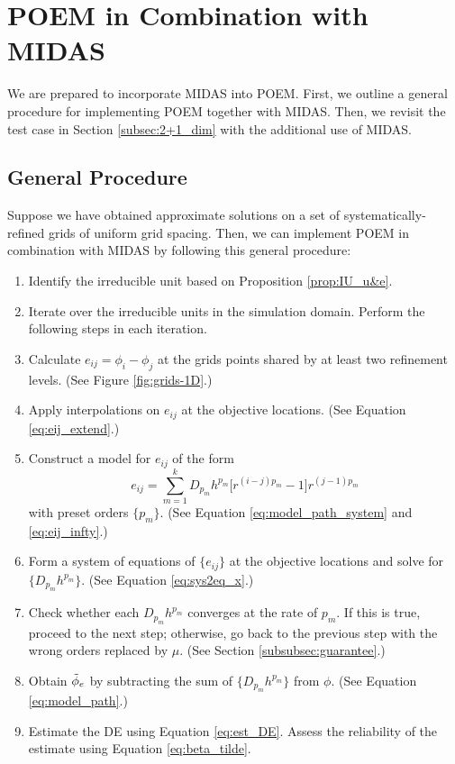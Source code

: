 \section{POEM in Combination with MIDAS} \label{sec:POEM-MIDAS}
We are prepared to incorporate MIDAS into POEM. First, we outline a general procedure for implementing POEM together with MIDAS. Then, we revisit the test case in Section \ref{subsec:2+1_dim} with the additional use of MIDAS.

\subsection{General Procedure} \label{subsec:general_proc}
Suppose we have obtained approximate solutions on a set of systematically-refined grids of uniform grid spacing. Then, we can implement POEM in combination with MIDAS by following this general procedure:
\begin{enumerate}
    \item Identify the irreducible unit based on Proposition \ref{prop:IU_u&e}.
    \item Iterate over the irreducible units in the simulation domain. Perform the following steps in each iteration.
    \item Calculate $e_{ij} = \phi_{i} - \phi_{j}$ at the grids points shared by at least two refinement levels. (See Figure \ref{fig:grids-1D}.)
    \item Apply interpolations on $e_{ij}$ at the objective locations. (See Equation \ref{eq:eij_extend}.)
    \item Construct a model for $e_{ij}$ of the form
    \begin{equation}  \label{eq:eij_path}
        e_{ij} = \sum_{m=1}^{k} D_{p_m} h^{p_m} \big[ r^{(i-j)p_m} - 1 \big] r^{(j-1)p_m}
    \end{equation}
    with preset orders $\{p_m\}$. (See Equation \ref{eq:model_path_system} and \ref{eq:eij_infty}.)
    \item Form a system of equations of $\{e_{ij}\}$ at the objective locations and solve for $\{D_{p_m} h^{p_m}\}$. (See Equation \ref{eq:sys2eq_x}.)
    \item Check whether each $D_{p_m} h^{p_m}$ converges at the rate of $p_m$. If this is true, proceed to the next step; otherwise, go back to the previous step with the wrong orders replaced by $\mu$. (See Section \ref{subsubsec:guarantee}.)
    \item Obtain $\Tilde{\phi}_e$ by subtracting the sum of $\{D_{p_m} h^{p_m}\}$ from $\phi$. (See Equation \ref{eq:model_path}.)
    \item Estimate the DE using Equation \ref{eq:est_DE}. Assess the reliability of the estimate using Equation \ref{eq:beta_tilde}.
\end{enumerate}

